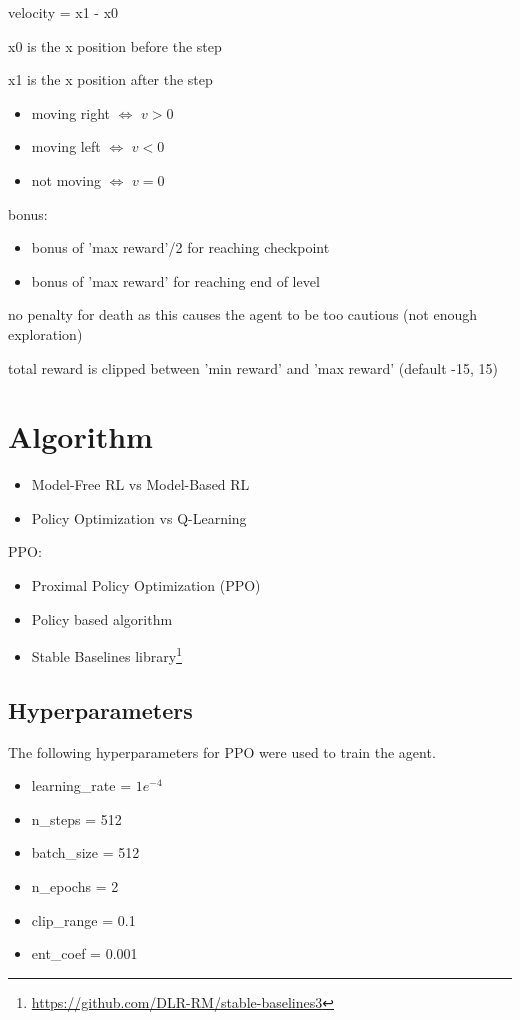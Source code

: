 \documentclass{article}
\begin{document}
velocity = x1 - x0

x0 is the x position before the step

x1 is the x position after the step

\begin{itemize}
    \item moving right $\Leftrightarrow$ $v > 0$
    \item moving left $\Leftrightarrow$ $v < 0$
    \item not moving $\Leftrightarrow$ $v = 0$
\end{itemize}
bonus:
\begin{itemize}
    \item bonus of 'max reward'/2 for reaching checkpoint
    \item bonus of 'max reward' for reaching end of level
\end{itemize}
no penalty for death as this causes the agent to be too cautious (not enough exploration)

total reward is clipped between 'min reward' and 'max reward' (default -15, 15)

\section{Algorithm}
\begin{itemize}
    \item Model-Free RL vs Model-Based RL
    \item Policy Optimization vs Q-Learning
\end{itemize}
PPO:
\begin{itemize}
    \item Proximal Policy Optimization (PPO)\cite{schulman2017proximal}
    \item Policy based algorithm
    \item Stable Baselines library\footnote{\url{https://github.com/DLR-RM/stable-baselines3}}
\end{itemize}
\subsection{Hyperparameters}
The following hyperparameters for PPO were used to train the agent.
\begin{itemize}
    \item learning\_rate = $1e^{-4}$
    \item n\_steps = 512
    \item batch\_size = 512
    \item n\_epochs = 2
    \item clip\_range = 0.1
    \item ent\_coef = 0.001
\end{itemize}
\end{document}
